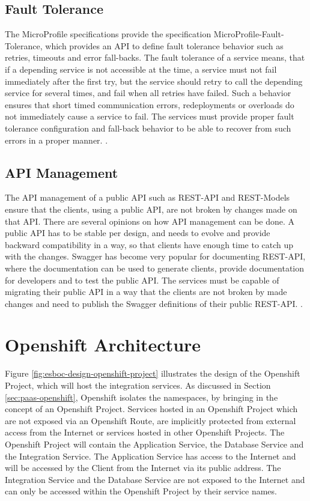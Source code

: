 \subsection{Fault Tolerance}
\label{sec:esboc-requirements-service-fault}
The MicroProfile specifications provide the specification MicroProfile-Fault-Tolerance, which provides an API to define fault tolerance behavior such as retries, timeouts and error fall-backs. The fault tolerance of a service means, that if a depending service is not accessible at the time, a service must not fail immediately after the first try, but the service should retry to call the depending service for several times, and fail when all retries have failed. Such a behavior ensures that short timed communication errors, redeployments or overloads do not immediately cause a service to fail. The services must provide proper fault tolerance configuration and fall-back behavior to be able to recover from such errors in a proper manner. \cite{EclipseMicroprofileFault2018}.   

\subsection{API Management}
\label{sec:esboc-requirements-service-api}
The API management of a public API such as REST-API and REST-Models ensure that the clients, using a public API, are not broken by changes made on that API. There are several opinions on how API management can be done. A public API has to be stable per design, and needs to evolve and provide backward compatibility in a way, so that clients have enough time to catch up with the changes. Swagger has become very popular for documenting REST-API, where the documentation can be used to generate clients, provide documentation for developers and to test the public API. The services must be capable of migrating their public API in a way that the clients are not broken by made changes and need to publish the Swagger definitions of their public REST-API. \cite{SmartBearSwagger2018, RestVersion2018}.

\section{Openshift Architecture}
\label{sec:esboc-design-oc}
Figure \vref{fig:esboc-design-openshift-project} illustrates the design of the Openshift Project, which will host the integration services. As discussed in Section \vref{sec:paas-openshift}, Openshift isolates the namespaces, by bringing in the concept of an Openshift Project. Services hosted in an Openshift Project which are not exposed via an Openshift Route, are implicitly protected from external access from the Internet or services hosted in other Openshift Projects. The Openshift Project will contain the Application Service, the Database Service and the Integration Service. The Application Service has access to the Internet and will be accessed by the Client from the Internet via its public address. The Integration Service and the Database Service are not exposed to the Internet and can only be accessed within the Openshift Project by their service names.

